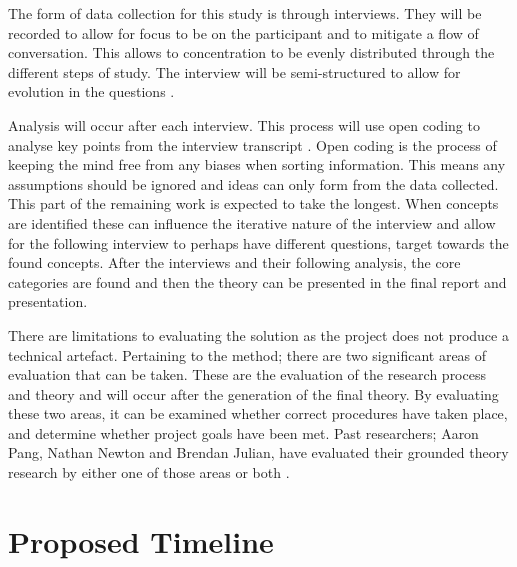 \par The form of data collection for this study is through interviews. They will be recorded to allow for focus to be on the participant and to mitigate a flow of conversation. This allows to concentration to be evenly distributed through the different steps of study. The interview will be semi-structured to allow for evolution in the questions \cite{geeks}. 
\newline
\par Analysis will occur after each interview. This process will use open coding to analyse key points from the interview transcript \cite{geeks}. Open coding is the process of keeping the mind free from any biases when sorting information. This means any assumptions should be ignored and ideas can only form from the data collected. This part of the remaining work is expected to take the longest. When concepts are identified these can influence the iterative nature of the interview and allow for the following interview to perhaps have different questions, target towards the found concepts. After the interviews and their following analysis, the core categories are found and then the theory can be presented in the final report and presentation. 
\newline
\par 
There are limitations to evaluating the solution as the project does not produce a technical artefact. Pertaining to the method; there are two significant areas of evaluation that can be taken. These are the evaluation of the research process and theory and will occur after the generation of the final theory. By evaluating these two areas, it can be examined whether correct procedures have taken place, and determine whether project goals have been met. Past researchers; Aaron Pang, Nathan Newton and Brendan Julian, have evaluated their grounded theory research by either one of those areas or both \cite{nathan,2,pang}. 
 
\section{Proposed Timeline}


